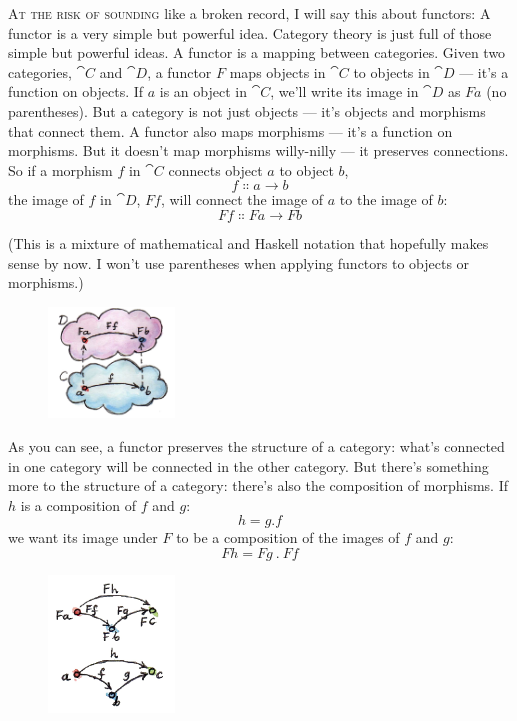 
\lettrine[lhang=0.17]{A}{t the risk of sounding} like a broken record, I will say this about
functors: A functor is a very simple but powerful idea. Category theory
is just full of those simple but powerful ideas. A functor is a mapping
between categories. Given two categories, $\cat{C}$ and $\cat{D}$, a functor $F$ maps
objects in $\cat{C}$ to objects in $\cat{D}$ --- it's a function on objects. If $a$
is an object in $\cat{C}$, we'll write its image in $\cat{D}$ as $F a$ (no
parentheses). But a category is not just objects --- it's objects and
morphisms that connect them. A functor also maps morphisms --- it's a
function on morphisms. But it doesn't map morphisms willy-nilly --- it
preserves connections. So if a morphism $f$ in $\cat{C}$ connects object
$a$ to object $b$,
\[f \Colon a \to b\]
the image of $f$ in $\cat{D}$, $F f$, will connect the image of
$a$ to the image of $b$:
\[F f \Colon F a \to F b\]

(This is a mixture of mathematical and Haskell notation that hopefully
makes sense by now. I won't use parentheses when applying functors to
objects or morphisms.)

\begin{figure}[H]
\centering\includegraphics[width=0.3\textwidth]{images/functor.jpg}
\end{figure}

\noindent
As you can see, a
functor preserves the structure of a category: what's connected in one
category will be connected in the other category. But there's something
more to the structure of a category: there's also the composition of
morphisms. If $h$ is a composition of $f$ and $g$:
\[h = g . f\]
we want its image under $F$ to be a composition of the images of $f$
and $g$:
\[F h = F g~.~F f\]

\begin{figure}[H]
\centering
\includegraphics[width=0.3\textwidth]{images/functorcompos.jpg}
\end{figure}

